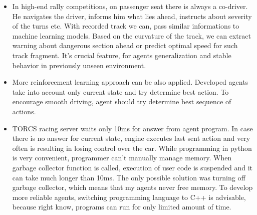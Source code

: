 \documentclass[declaration,shortabstract,english,inz]{iithesis}
\begin{document}
\begin{itemize}
    \item In high-end rally competitions, on passenger seat there is always a co-driver.
    He navigates the driver, informs him what lies ahead, instructs about severity of the turns etc. With recorded track we can, pass similar informations to machine learning models. Based on the curvature of the track, we can extract warning about dangerous section ahead or predict optimal speed for such track fragment.
    It's crucial feature, for agents generalization and stable behavior in previously unseen environment.

    \item More reinforcement learning approach can be also applied.
    Developed agents take into account only current state and try determine best action.
    To encourage smooth driving, agent should try determine best sequence of actions.

    \item TORCS racing server waits only 10ms for answer from agent program.
In case there is no answer for current state, engine executes last sent action and very often is resulting in losing control over the car.
While programming in python is very convenient, programmer can't manually manage memory.
When garbage collector function is called, execution of user code is suspended and it can take much longer than 10ms.
The only possible solution was turning off garbage collector, which means that my agents never free memory.
To develop more reliable agents, switching programming language to C++ is advisable, because right know, programs can run for only limited amount of time.
\end{itemize}


\end{document}
